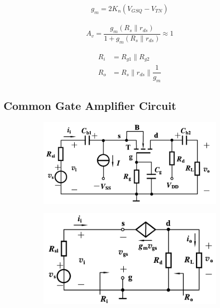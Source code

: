 \begin{equation*}
  \begin{aligned}
    g_m = 2 K_n \left( V_{GSQ} - V_{TN} \right)
  \end{aligned}
\end{equation*}

\begin{equation*}
  \begin{aligned}
    A_v = \dfrac{g_m \left( R_s \parallel r_{ds} \right)}{1 + g_m \left( R_s \parallel r_{ds} \right)} \approx 1
  \end{aligned}
\end{equation*}

\begin{equation*}
  \begin{aligned}
    R_i &= R_{g1} \parallel R_{g2} \\
    R_o &= R_s \parallel r_{ds} \parallel \dfrac{1}{g_m} 
  \end{aligned}
\end{equation*}


\subsection{Common Gate Amplifier Circuit}

\begin{figure}[H]
  \centering
  \begin{subfigure}{.45\textwidth}
    \centering
    \includegraphics[width=\linewidth]{figures/MOSFET-Common-G}
  \end{subfigure}
  \begin{subfigure}{.45\textwidth}
    \centering
    \includegraphics[width=\linewidth]{figures/MOSFET-Common-Gs}
  \end{subfigure}
\end{figure}

